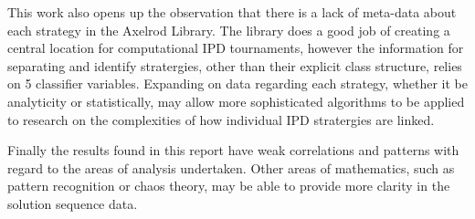 This work also opens up the observation that there is a lack of meta-data about each strategy in the Axelrod Library.
The library does a good job of creating a central location for computational IPD tournaments, however the information for separating and identify stratergies, other than their explicit class structure, relies on 5 classifier variables.
Expanding on data regarding each strategy, whether it be analyticity or statistically, may allow more sophisticated algorithms to be applied to research on the complexities of how individual IPD stratergies are linked.

Finally the results found in this report have weak correlations and patterns with regard to the areas of analysis undertaken.
Other areas of mathematics, such as pattern recognition or chaos theory, may be able to provide more clarity in the solution sequence data. 
